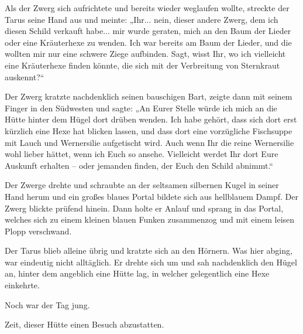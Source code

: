 Als der Zwerg sich aufrichtete und bereits wieder weglaufen wollte, streckte der Tarus seine Hand aus und meinte: „Ihr... nein, dieser andere Zwerg, dem ich diesen Schild verkauft habe... mir wurde geraten, mich an den Baum der Lieder oder eine Kräuterhexe zu wenden. Ich war bereits am Baum der Lieder, und die wollten mir nur eine schwere Ziege aufbinden. Sagt, wisst Ihr, wo ich vielleicht eine Kräuterhexe finden könnte, die sich mit der Verbreitung von Sternkraut auskennt?“

Der Zwerg kratzte nachdenklich seinen bauschigen Bart, zeigte dann mit seinem Finger in den Südwesten und sagte: „An Eurer Stelle würde ich mich an die Hütte hinter dem Hügel dort drüben wenden. Ich habe gehört, dass sich dort erst kürzlich eine Hexe hat blicken lassen, und dass dort eine vorzügliche Fischsuppe mit Lauch und Wernersilie aufgetischt wird. Auch wenn Ihr die reine Wernersilie wohl lieber hättet, wenn ich Euch so ansehe. Vielleicht werdet Ihr dort Eure Auskunft erhalten – oder jemanden finden, der Euch den Schild abnimmt.“

Der Zwerge drehte und schraubte an der seltsamen silbernen Kugel in seiner Hand herum und ein großes blaues Portal bildete sich aus hellblauem Dampf. Der Zwerg blickte prüfend hinein. Dann holte er Anlauf und sprang in das Portal, welches sich zu einem kleinen blauen Funken zusammenzog und mit einem leisen Plopp verschwand.

Der Tarus blieb alleine übrig und kratzte sich an den Hörnern. Was hier abging, war eindeutig nicht alltäglich. Er drehte sich um und sah nachdenklich den Hügel an, hinter dem angeblich eine Hütte lag, in welcher gelegentlich eine Hexe einkehrte.

Noch war der Tag jung.

Zeit, dieser Hütte einen Besuch abzustatten.

